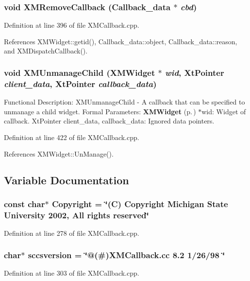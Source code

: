 \subsubsection{\setlength{\rightskip}{0pt plus 5cm}void XMRemove\-Callback ({\bf Callback\_\-data} $\ast$ {\em cbd})}\label{XMCallback_8cpp_a5}




Definition at line 396 of file XMCallback.cpp.

References XMWidget::getid(), Callback\_\-data::object, Callback\_\-data::reason, and XMDispatch\-Callback().
\subsubsection{\setlength{\rightskip}{0pt plus 5cm}void XMUnmanage\-Child ({\bf XMWidget} $\ast$ {\em wid}, Xt\-Pointer {\em client\_\-data}, Xt\-Pointer {\em callback\_\-data})}\label{XMCallback_8cpp_a6}


Functional Description: XMUnmanage\-Child - A callback that can be specified to unmanage a child widget. Formal Parameters: {\bf XMWidget} {\rm (p.\,\pageref{classXMWidget})} $\ast$wid: Widget of callback. Xt\-Pointer client\_\-data, callback\_\-data: Ignored data pointers. 

Definition at line 422 of file XMCallback.cpp.

References XMWidget::Un\-Manage().

\subsection{Variable Documentation}
\subsubsection{\setlength{\rightskip}{0pt plus 5cm}const char$\ast$ Copyright = \char`\"{}(C) Copyright Michigan State University 2002, All rights reserved\char`\"{}\hspace{0.3cm}{\tt  [static]}}\label{XMCallback_8cpp_a0}




Definition at line 278 of file XMCallback.cpp.
\subsubsection{\setlength{\rightskip}{0pt plus 5cm}char$\ast$ sccsversion = \char`\"{}@(\#){\bf XMCallback}.cc 8.2 1/26/98 \char`\"{}\hspace{0.3cm}{\tt  [static]}}\label{XMCallback_8cpp_a1}




Definition at line 303 of file XMCallback.cpp.